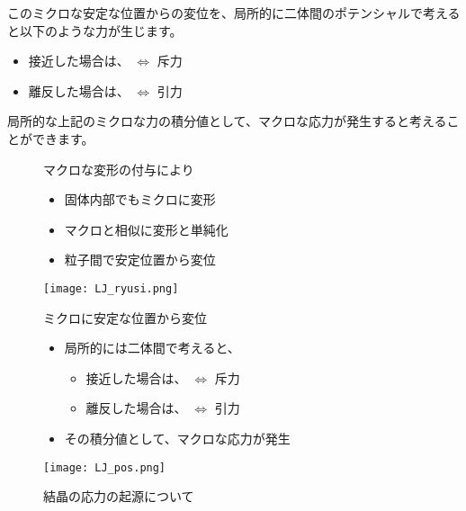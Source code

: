 \documentclass[uplatex,dvipdfmx,a4paper,11pt]{jsarticle}
\begin{document}
このミクロな安定な位置からの変位を、局所的に二体間のポテンシャルで考えると以下のような力が生じます。
\begin{itemize}
	\item 接近した場合は、 $\Leftrightarrow$ 斥力
	\item 離反した場合は、 $\Leftrightarrow$ 引力
\end{itemize}

局所的な上記のミクロな力の積分値として、マクロな応力が発生すると考えることができます。

\begin{figure}[htb]
	\begin{center}
		\begin{minipage}{0.45\textwidth}
			\large
			\begin{itembox}[l]{マクロな変形の付与により}
				\begin{itemize}
					\item 固体内部でもミクロに変形
					\item マクロと相似に変形と単純化
					\item 粒子間で安定位置から変位
				\end{itemize}
			\end{itembox}
			\begin{center}
				\texttt{[image: LJ\_ryusi.png]}
			\end{center}
		\end{minipage}
		\begin{minipage}{0.45\textwidth}
			\large
			\begin{itembox}[l]{ミクロに安定な位置から変位}
				\begin{itemize}
					\item 局所的には二体間で考えると、
					\begin{itemize}
						\item 接近した場合は、 $\Leftrightarrow$ 斥力
						\item 離反した場合は、 $\Leftrightarrow$ 引力
					\end{itemize}
					\item その積分値として、マクロな応力が発生
				\end{itemize}
			\end{itembox}
			\begin{center}
				\texttt{[image: LJ\_pos.png]}
			\end{center}
		\end{minipage}
		\caption{結晶の応力の起源について}
		\label{fig:stress_crystal}
	\end{center}
\end{figure}
\end{document}
